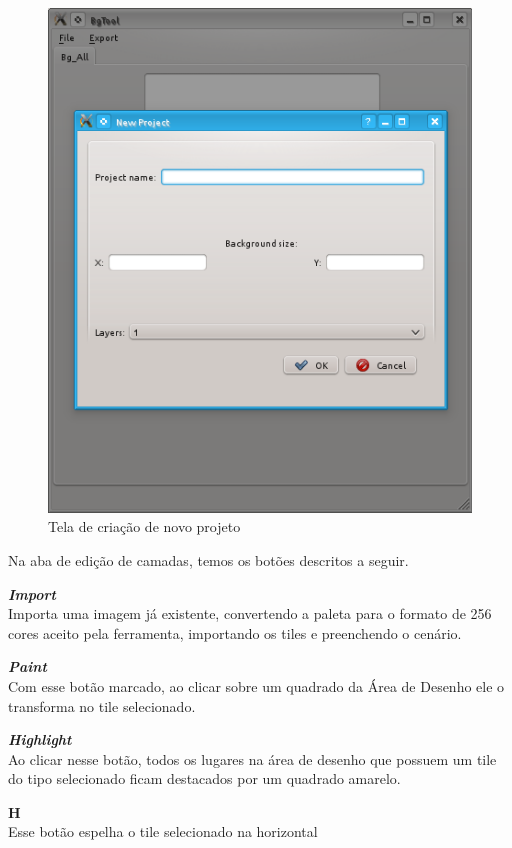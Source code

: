 \documentclass[brazil]{abnt}
\begin{document}
\begin{figure}[H]
\centering
\includegraphics[scale=.5]{imgs/bgtool4.png}
\caption{Tela de criação de novo projeto}
\label{fig:bgtool4}
\end{figure}

Na aba de edição de camadas, temos os botões descritos a seguir.

  \textbf{\textit{Import}}\\
           Importa uma imagem já existente, convertendo a paleta para o formato de 256 cores aceito pela ferramenta, importando os tiles e preenchendo o cenário.

  \textbf{\textit{Paint}}\\
           Com esse botão marcado, ao clicar sobre um quadrado da Área de Desenho ele o transforma no tile selecionado.

  \textbf{\textit{Highlight}}\\
           Ao clicar nesse botão, todos os lugares na área de desenho que possuem um tile do tipo selecionado ficam destacados por um quadrado amarelo.

  \textbf{H}\\
           Esse botão espelha o tile selecionado na horizontal
\end{document}

